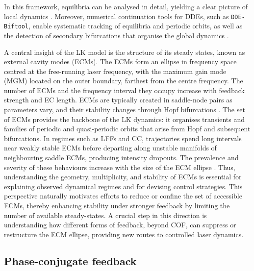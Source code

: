 In this framework, equilibria can be analysed in detail, yielding a clear picture of local dynamics \cite{rottschafer2007ecm}.
Moreover, numerical continuation tools for DDEs, such as \texttt{DDE-Biftool}, enable systematic tracking of equilibria and periodic orbits, as well as the detection of secondary bifurcations that organise the global dynamics \cite{sieber2014dde, krauskopf2004dynamics}.
%
\par
%
A central insight of the LK model is the structure of its steady states, known as external cavity modes (ECMs).
The ECMs form an ellipse in frequency space centred at the free-running laser frequency, with the maximum gain mode (MGM) located on the outer boundary, farthest from the centre frequency.
The number of ECMs and the frequency interval they occupy increase with feedback strength and EC length.
ECMs are typically created in saddle-node pairs as parameters vary, and their stability changes through Hopf bifurcations \cite{heil2003delay, rottschafer2007ecm}.
The set of ECMs provides the backbone of the LK dynamics: it organises transients and families of periodic and quasi-periodic orbits that arise from Hopf and subsequent bifurcations.
In regimes such as LFFs and CC, trajectories spend long intervals near weakly stable ECMs before departing along unstable manifolds of neighbouring saddle ECMs, producing intensity dropouts.
The prevalence and severity of these behaviours increase with the size of the ECM ellipse \cite{heil2003delay, krauskopf2004dynamics}.
Thus, understanding the geometry, multiplicity, and stability of ECMs is essential for explaining observed dynamical regimes and for devising control strategies.
This perspective naturally motivates efforts to reduce or confine the set of accessible ECMs, thereby enhancing stability under stronger feedback by limiting the number of available steady-states.
A crucial step in this direction is understanding how different forms of feedback, beyond COF, can suppress or restructure the ECM ellipse, providing new routes to controlled laser dynamics.
%
%
\subsection*{Phase-conjugate feedback}
\label{subsec:PCF}

